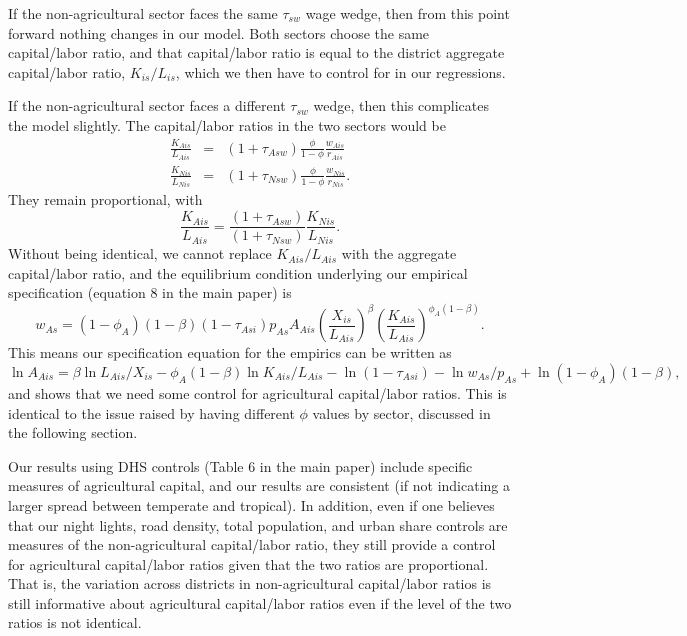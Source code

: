 \documentclass[11pt]{article}
\begin{document}
If the non-agricultural sector faces the same $\tau_{sw}$ wage wedge, then from this point forward nothing changes in our model. Both sectors choose the same capital/labor ratio, and that capital/labor ratio is equal to the district aggregate capital/labor ratio, $K_{is}/L_{is}$, which we then have to control for in our regressions.

If the non-agricultural sector faces a different $\tau_{sw}$ wedge, then this complicates the model slightly. The capital/labor ratios in the two sectors would be 
\begin{eqnarray}
    \frac{K_{Ais}}{L_{Ais}} &=& (1+\tau_{Asw}) \frac{\phi}{1-\phi} \frac{w_{Ais}}{r_{Ais}} \\
    \frac{K_{Nis}}{L_{Nis}} &=& (1+\tau_{Nsw}) \frac{\phi}{1-\phi} \frac{w_{Nis}}{r_{Nis}}.
\end{eqnarray}
They remain proportional, with 
\begin{equation}
    \frac{K_{Ais}}{L_{Ais}} = \frac{(1+\tau_{Asw})}{(1+\tau_{Nsw})}\frac{K_{Nis}}{L_{Nis}}.
\end{equation}
Without being identical, we cannot replace $K_{Ais}/L_{Ais}$ with the aggregate capital/labor ratio, and the equilibrium condition underlying our empirical specification (equation 8 in the main paper) is
\begin{equation}
    w_{As} = (1-\phi_A)(1-\beta) (1-\tau_{Asi}) p_{As} A_{Ais} \left(\frac{X_{is}}{L_{Ais}}\right)^{\beta} \left(\frac{K_{Ais}}{L_{Ais}}\right)^{\phi_A(1-\beta)}. 
\end{equation}
This means our specification equation for the empirics can be written as
\begin{equation}
    \ln A_{Ais} = \beta \ln L_{Ais}/X_{is} - \phi_A(1-\beta) \ln K_{Ais}/L_{Ais} - \ln (1-\tau_{Asi}) - \ln w_{As}/p_{As} + \ln (1-\phi_A)(1-\beta),
\end{equation}
and shows that we need some control for agricultural capital/labor ratios. This is identical to the issue raised by having different $\phi$ values by sector, discussed in the following section.

Our results using DHS controls (Table 6 in the main paper) include specific measures of agricultural capital, and our results are consistent (if not indicating a larger spread between temperate and tropical). In addition, even if one believes that our night lights, road density, total population, and urban share controls are measures of the non-agricultural capital/labor ratio, they still provide a control for agricultural capital/labor ratios given that the two ratios are proportional. That is, the variation across districts in non-agricultural capital/labor ratios is still informative about agricultural capital/labor ratios even if the level of the two ratios is not identical.
\end{document}
